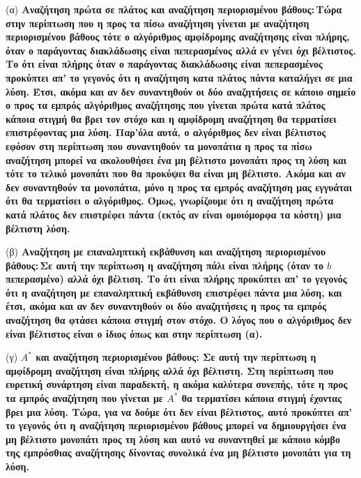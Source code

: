 \documentclass[12pt]{article}
\theoremstyle{definition}
\begin{document}
\noindent (α) \bf Αναζήτηση πρώτα σε πλάτος και αναζήτηση περιορισμένου βάθους:\,\normalfont Τώρα στην περίπτωση που η προς τα πίσω αναζήτηση γίνεται με αναζήτηση περιορισμένου βάθους τότε ο αλγόριθμος αμφίδρομης αναζήτησης \bf είναι πλήρης\normalfont, όταν ο παράγοντας διακλάδωσης είναι πεπερασμένος αλλά εν γένει \bf όχι βέλτιστος. \normalfont Το ότι είναι πλήρης όταν ο παράγοντας διακλάδωσης είναι πεπερασμένος προκύπτει απ' το γεγονός ότι η αναζήτηση κατα πλάτος πάντα καταλήγει σε μια λύση. Έτσι, ακόμα και αν δεν συναντηθούν οι δύο αναζητήσεις σε κάποιο σημείο ο προς τα εμπρός αλγόριθμος αναζήτησης που γίνεται πρώτα κατά πλάτος κάποια στιγμή θα βρει τον στόχο και η αμφίδρομη αναζήτηση θα τερματίσει επιστρέφοντας μια λύση. Παρ'όλα αυτά, ο αλγόριθμος δεν είναι βέλτιστος εφόσον στη περίπτωση που συναντηθούν τα μονοπάτια η προς τα πίσω αναζήτηση μπορεί να ακολουθήσει ένα μη βέλτιστο μονοπάτι προς τη λύση και τότε το τελικό μονοπάτι που θα προκύψει θα είναι μη βέλτιστο. Ακόμα και αν δεν συναντηθούν τα μονοπάτια, μόνο η προς τα εμπρός αναζήτηση μας εγγυάται ότι θα τερματίσει ο αλγόριθμος. Όμως, γνωρίζουμε ότι η αναζήτηση πρώτα κατά πλάτος δεν επιστρέφει πάντα (εκτός αν είναι ομοιόμορφα τα κόστη) μια βέλτιστη λύση.
\vspace{2mm}

\noindent (β) \bf Αναζήτηση με επαναληπτική εκβάθυνση και αναζήτηση περιορισμένου βάθους:\,\normalfont Σε αυτή την περίπτωση η αναζήτηση πάλι \bf είναι πλήρης \normalfont (όταν το $b$ πεπερασμένο) αλλά \bf όχι βέλτιση. \normalfont Το ότι είναι πλήρης προκύπτει απ' το γεγονός ότι η αναζήτηση με επαναληπτική εκβάθυνση επιστρέφει πάντα μια λύση, και έτσι, ακόμα και αν δεν συναντηθούν οι δύο αναζητήσεις η προς τα εμπρός αναζήτηση θα φτάσει κάποια στιγμή στον στόχο. Ο λόγος που ο αλγόριθμος δεν είναι βέλτιστος είναι ο ίδιος όπως και στην περίπτωση (α).
\vspace{2mm}

\noindent (γ) \bf $A^*$ και αναζήτηση περιορισμένου βάθους: \normalfont Σε αυτή την περίπτωση η αμφίδρομη αναζήτηση \bf είναι πλήρης αλλά όχι βέλτιστη. \normalfont Στη περίπτωση που ευρετική συνάρτηση είναι παραδεκτή, η ακόμα καλύτερα συνεπής, τότε η προς τα εμπρός αναζήτηση που γίνεται με $A^*$ θα τερματίσει κάποια στιγμή έχοντας βρει μια λύση. \normalfont Τώρα, για να δούμε ότι δεν είναι βέλτιστος, αυτό προκύπτει απ' το γεγονός ότι η αναζήτηση περιορισμένου βάθους μπορεί να δημιουργήσει ένα μη βέλτιστο μονοπάτι προς τη λύση και αυτό να συναντηθεί με κάποιο κόμβο της εμπρόσθιας αναζήτησης δίνοντας συνολικά ένα μη βέλτιστο μονοπάτι για τη λύση.
\vspace{2mm}
\end{document}
